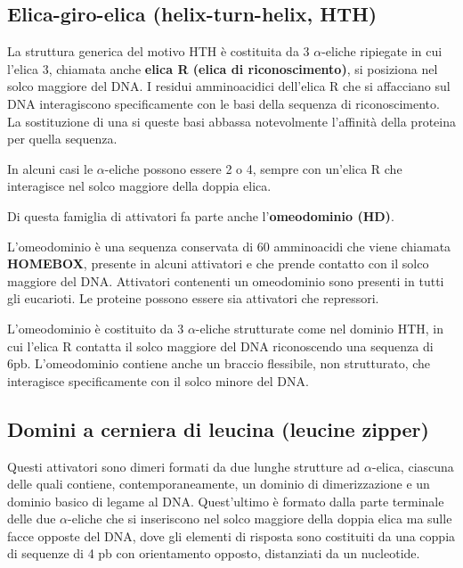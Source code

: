 \documentclass[11pt]{book}
\begin{document}
\subsection{Elica-giro-elica (helix-turn-helix,
HTH)}\label{elica-giro-elica-helix-turn-helix-hth}

La struttura generica del motivo HTH è costituita da 3 \(\alpha\)-eliche
ripiegate in cui l'elica 3, chiamata anche \textbf{elica R (elica di
riconoscimento)}, si posiziona nel solco maggiore del DNA. I residui
amminoacidici dell'elica R che si affacciano sul DNA interagiscono
specificamente con le basi della sequenza di riconoscimento. La
sostituzione di una si queste basi abbassa notevolmente l'affinità della
proteina per quella sequenza.

In alcuni casi le \(\alpha\)-eliche possono essere 2 o 4, sempre con
un'elica R che interagisce nel solco maggiore della doppia elica.

Di questa famiglia di attivatori fa parte anche l'\textbf{omeodominio
(HD)}.

L'omeodominio è una sequenza conservata di 60 amminoacidi che viene
chiamata \textbf{HOMEBOX}, presente in alcuni attivatori e che prende
contatto con il solco maggiore del DNA. Attivatori contenenti un
omeodominio sono presenti in tutti gli eucarioti. Le proteine possono
essere sia attivatori che repressori.

L'omeodominio è costituito da 3 \(\alpha\)-eliche strutturate come nel
dominio HTH, in cui l'elica R contatta il solco maggiore del DNA
riconoscendo una sequenza di 6pb. L'omeodominio contiene anche un
braccio flessibile, non strutturato, che interagisce specificamente con
il solco minore del DNA.

\subsection{Domini a cerniera di leucina (leucine
zipper)}\label{domini-a-cerniera-di-leucina-leucine-zipper}

Questi attivatori sono dimeri formati da due lunghe strutture ad
\(\alpha\)-elica, ciascuna delle quali contiene, contemporaneamente, un
dominio di dimerizzazione e un dominio basico di legame al DNA.
Quest'ultimo è formato dalla parte terminale delle due \(\alpha\)-eliche
che si inseriscono nel solco maggiore della doppia elica ma sulle facce
opposte del DNA, dove gli elementi di risposta sono costituiti da una
coppia di sequenze di 4 pb con orientamento opposto, distanziati da un
nucleotide.
\end{document}
